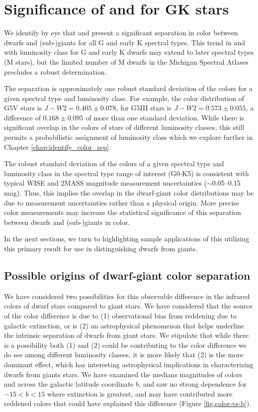 \chapter{Significance of \jwone and \jwtwo for GK stars}\label{chap:sig_of_colors}

We identify by eye that \jwone and \jwtwo present a significant separation in color between dwarfs and (sub-)giants for all G and early K spectral types. This trend in \jwone and \jwtwo with luminosity class for G and early K dwarfs may extend to later spectral types (M stars), but the limited number of M dwarfs in the Michigan Spectral Atlases precludes a robust determination.

The separation is approximately one robust standard deviation of the colors for a given spectral type and luminosity class. For example, the color distribution of G5V stars is $J-W2=0.405\pm0.078$, for G5III stars is $J-W2=0.573\pm0.055$, a difference of $0.168\pm0.095$ of more than one standard deviation. While there is significant overlap in the colors of stars of different luminosity classes, this still permits a probabilistic assignment of luminosity class which we explore further in Chapter \ref{chap:identify_color_sep}.

The robust standard deviation of the colors of a given spectral type and luminosity class in the spectral type range of interest (G0-K5) is consistent with typical WISE and 2MASS magnitude measurement uncertainties ($\sim$0.05--0.15 mag). Thus, this implies the overlap in the dwarf-giant color distributions may be due to measurement uncertainties rather than a physical origin.  More precise color measurements may increase the statistical significance of this separation between dwarfs and (sub-)giants in color.

In the next sections, we turn to highlighting sample applications of this utilizing this primary result for use in distinguishing dwarfs from giants.

\section{Possible origins of dwarf-giant color separation}

We have considered two possibilities for this observable difference in the infrared colors of dwarf stars compared to giant stars. We have considered that the source of the color difference is due to (1) observational bias from reddening due to galactic extinction, or is (2) an astrophysical phenomenon that helps underline the intrinsic separation of dwarfs from giant stars. We stipulate that while there is a possibility both (1) and (2) could be contributing to the color difference we do see among different luminosity classes, it is more likely that (2) is the more dominant effect, which has interesting astrophysical implications in characterizing dwarfs from giants stars. We have examined the medians magnitudes of colors \jwone and \jwtwo across the galactic latitude coordinate $b$, and saw no strong dependence for $-15<b<15$ where extinction is greatest, and may have contributed more reddened colors that could have explained this difference (Figure \ref{fig:color-vs-b}).

